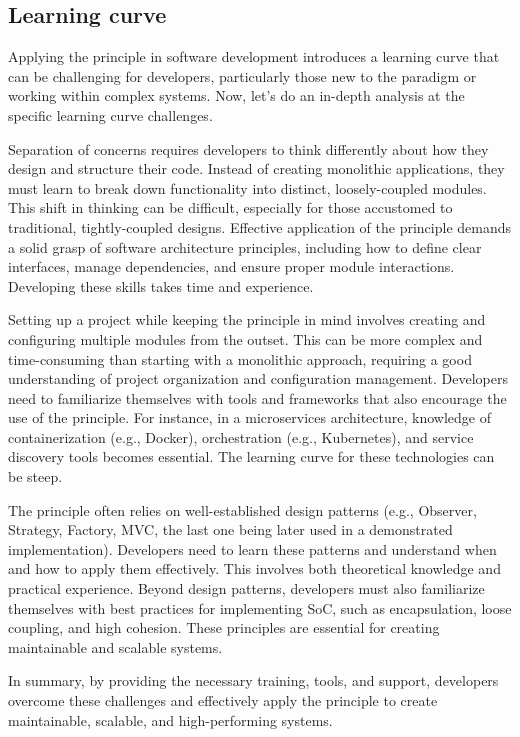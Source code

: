 \subsection{Learning curve}
Applying the principle in software development introduces a learning curve that can be challenging for developers, 
particularly those new to the paradigm or working within complex systems. 
Now, let's do an in-depth analysis at the specific learning curve challenges.
\par
Separation of concerns requires developers to think differently about how they design and structure their code. Instead of creating monolithic applications, they must learn to break down functionality into distinct, loosely-coupled modules. This shift in thinking can be difficult, especially for those accustomed to traditional, tightly-coupled designs.
Effective application of the principle demands a solid grasp of software architecture principles, including how to define clear interfaces, manage dependencies, and ensure proper module interactions. Developing these skills takes time and experience.
\par
Setting up a project while keeping the principle in mind involves creating and configuring multiple modules from the outset. This can be more complex and time-consuming than starting with a monolithic approach, requiring a good understanding of project organization and configuration management.
Developers need to familiarize themselves with tools and frameworks that also encourage the use of the principle. For instance, in a microservices architecture, knowledge of containerization (e.g., Docker), orchestration (e.g., Kubernetes), and service discovery tools becomes essential. The learning curve for these technologies can be steep.
\par
The principle often relies on well-established design patterns (e.g., Observer, Strategy, Factory, MVC, the last one being later used in a demonstrated implementation). Developers need to learn these patterns and understand when and how to apply them effectively. This involves both theoretical knowledge and practical experience.
Beyond design patterns, developers must also familiarize themselves with best practices for implementing SoC, such as encapsulation, loose coupling, and high cohesion. These principles are essential for creating maintainable and scalable systems.
\par
In summary, by providing the necessary training, tools, and support, developers overcome these challenges and effectively apply the principle to create maintainable, scalable, and high-performing systems.

